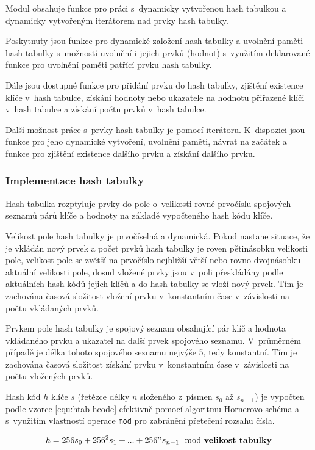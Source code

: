 \documentclass[a4paper, 12pt]{report}
\begin{document}
Modul obsahuje funkce pro práci s~dynamicky vytvořenou hash tabulkou a 
dynamicky vytvořeným iterátorem nad prvky hash tabulky.

Poskytnuty jsou funkce pro dynamické založení hash tabulky a uvolnění 
paměti hash tabulky s~možností uvolnění i jejich prvků (hodnot) s~využitím 
deklarované funkce pro uvolnění paměti patřící prvku hash tabulky.

Dále jsou dostupné funkce pro přidání prvku do hash tabulky, zjištění 
existence klíče v~hash tabulce, získání hodnoty nebo ukazatele na hodnotu 
přiřazené klíči v~hash tabulce a získání počtu prvků v~hash tabulce.

Další možnost práce s~prvky hash tabulky je pomocí iterátoru. K~dispozici 
jsou funkce pro jeho dynamické vytvoření, uvolnění paměti, návrat na 
začátek a funkce pro zjištění existence dalšího prvku a získání dalšího 
prvku.

\subsubsection{Implementace hash tabulky}

Hash tabulka rozptyluje prvky do pole o~velikosti rovné prvočíslu 
spojových seznamů párů klíče a hodnoty na základě vypočteného hash kódu 
klíče.

Velikost pole hash tabulky je prvočíselná a dynamická. Pokud nastane 
situace, že je vkládán nový prvek a počet prvků hash tabulky je roven 
pětinásobku velikosti pole, velikost pole se zvětší na prvočíslo nejbližší 
větší nebo rovno dvojnásobku aktuální velikosti pole, dosud vložené prvky 
jsou v~poli přeskládány podle aktuálních hash kódů jejich klíčů a do hash 
tabulky se vloží nový prvek. Tím je zachována časová složitost vložení 
prvku v~konstantním čase v~závislosti na počtu vkládaných prvků.

Prvkem pole hash tabulky je spojový seznam obsahující pár klíč a hodnota 
vkládaného prvku a ukazatel na další prvek spojového seznamu. V~průměrném 
případě je délka tohoto spojového seznamu nejvýše 5, tedy konstantní. Tím 
je zachována časová složitost získání prvku v~konstantním čase
v~závislosti na počtu vložených prvků.

Hash kód $h$ klíče $s$ (řetězce délky $n$ složeného z~písmen $s_0$ až 
$s_{n-1}$) je vypočten podle vzorce \ref{equ:htab-hcode} efektivně pomocí 
algoritmu Hornerovo schéma a s~využitím vlastností operace \texttt{mod} 
pro zabránění přetečení rozsahu čísla.

\begin{equation}
    h = 256 s_0 + 256^2 s_1 + ... + 256^n s_{n-1} \mod \text{\textbf{velikost tabulky}}
    \label{equ:htab-hcode}
\end{equation}
\end{document}
